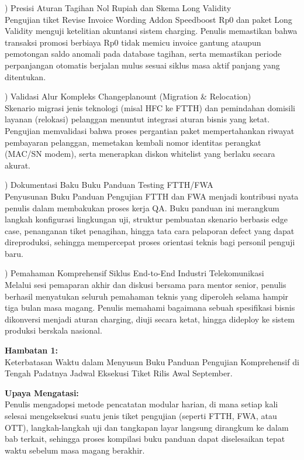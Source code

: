 \documentclass[12pt,a4paper]{article}
\begin{document}
\vspace{0.2cm}
) Presisi Aturan Tagihan Nol Rupiah dan Skema Long Validity\\
Pengujian tiket Revise Invoice Wording Addon Speedboost Rp0 dan paket Long Validity menguji ketelitian akuntansi sistem charging. Penulis memastikan bahwa transaksi promosi berbiaya Rp0 tidak memicu invoice gantung ataupun pemotongan saldo anomali pada database tagihan, serta memastikan periode perpanjangan otomatis berjalan mulus sesuai siklus masa aktif panjang yang ditentukan.

\vspace{0.2cm}
) Validasi Alur Kompleks Changeplanount (Migration \& Relocation)\\
Skenario migrasi jenis teknologi (misal HFC ke FTTH) dan pemindahan domisili layanan (relokasi) pelanggan menuntut integrasi aturan bisnis yang ketat. Pengujian memvalidasi bahwa proses pergantian paket mempertahankan riwayat pembayaran pelanggan, memetakan kembali nomor identitas perangkat (MAC/SN modem), serta menerapkan diskon whitelist yang berlaku secara akurat.

\vspace{0.2cm}
) Dokumentasi Baku Buku Panduan Testing FTTH/FWA\\
Penyusunan Buku Panduan Pengujian FTTH dan FWA menjadi kontribusi nyata penulis dalam membakukan proses kerja QA. Buku panduan ini merangkum langkah konfigurasi lingkungan uji, struktur pembuatan skenario berbasis edge case, penanganan tiket penagihan, hingga tata cara pelaporan defect yang dapat direproduksi, sehingga mempercepat proses orientasi teknis bagi personil penguji baru.

\vspace{0.2cm}
) Pemahaman Komprehensif Siklus End-to-End Industri Telekomunikasi\\
Melalui sesi pemaparan akhir dan diskusi bersama para mentor senior, penulis berhasil menyatukan seluruh pemahaman teknis yang diperoleh selama hampir tiga bulan masa magang. Penulis memahami bagaimana sebuah spesifikasi bisnis dikonversi menjadi aturan charging, diuji secara ketat, hingga dideploy ke sistem produksi berskala nasional.

\clearpage
{}
\vspace{0.1cm}
\noindent\textbf{Hambatan 1:}\\
Keterbatasan Waktu dalam Menyusun Buku Panduan Pengujian Komprehensif di Tengah Padatnya Jadwal Eksekusi Tiket Rilis Awal September.\par
\vspace{0.1cm}
\noindent\textbf{Upaya Mengatasi:}\\
Penulis mengadopsi metode pencatatan modular harian, di mana setiap kali selesai mengeksekusi suatu jenis tiket pengujian (seperti FTTH, FWA, atau OTT), langkah-langkah uji dan tangkapan layar langsung dirangkum ke dalam bab terkait, sehingga proses kompilasi buku panduan dapat diselesaikan tepat waktu sebelum masa magang berakhir.
\end{document}
